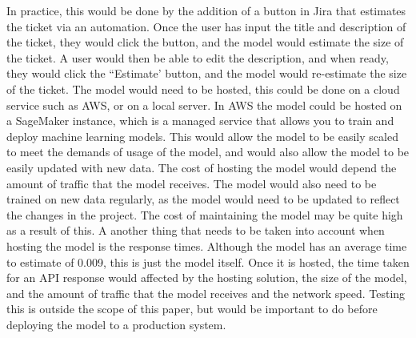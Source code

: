 \documentclass{UoYCSproject}
\begin{document}
    In practice, this would be done by the addition of a button in Jira that estimates the ticket via an automation.
Once the user has input the title and description of the ticket, they would click the button, and the model would estimate the size of the ticket.
A user would then be able to edit the description, and when ready, they would click the ``Estimate' button, and the model would re-estimate the size of the ticket.
    The model would need to be hosted, this could be done on a cloud service such as AWS, or on a local server.
In AWS the model could be hosted on a SageMaker instance, which is a managed service that allows you to train and deploy machine learning models.
This would allow the model to be easily scaled to meet the demands of usage of the model, and would also allow the model to be easily updated with new data.
The cost of hosting the model would depend the amount of traffic that the model receives.
The model would also need to be trained on new data regularly, as the model would need to be updated to reflect the changes in the project.
The cost of maintaining the model may be quite high as a result of this.
A another thing that needs to be taken into account when hosting the model is the response times.
Although the model has an average time to estimate of 0.009, this is just the model itself. Once it is hosted, the time taken for an API response would affected by the hosting solution, the size of the model, and the amount of traffic that the model receives and the network speed.
Testing this is outside the scope of this paper, but would be important to do before deploying the model to a production system.
\end{document}
